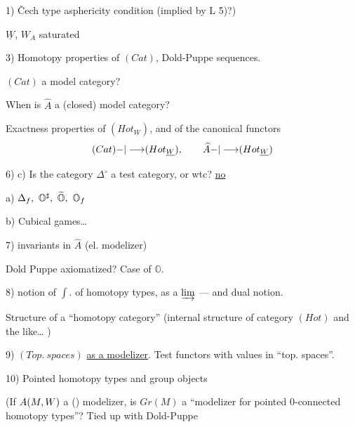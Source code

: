 1) \v{C}ech type asphericity condition (implied by L 5)?)

 $\underline W$, $W_A$ saturated

3) Homotopy properties of $(Cat)$,  Dold-Puppe sequences.

$(Cat)$ a model category?

 When is $\widehat A$ a (closed) model category?

 Exactness properties of $(Hot_{\underline W})$, and of the canonical functors
\[
(Cat){-|\longrightarrow}(Hot_{\underline W}),\qquad
\widehat A{-|\longrightarrow}(Hot_{\underline W})
\]

6) c) Is the category $\Delta^\circ$ a test category, or wtc? \uline{no}

a)  $\Delta_f,\ \mathbb O^{{\sharp}},\ \widetilde{\mathbb O},\ \mathbb O_f$

b) Cubical games\ldots

7)  invariants in $\widehat A$ (el. modelizer)

Dold Puppe axiomatized? Case of $\mathbb O$.

8)  notion of $\int.$ of homotopy types, as a $\varinjlim$ --- and dual notion.

Structure of a ``homotopy category'' (internal structure of category $(Hot)$ and the like\ldots
{})

9) $(Top.\ spaces)$ \uline{as a modelizer}. Test functors with values in ``top. spaces''.

10) Pointed homotopy types and group objects

(If ${A}(M,W)$ a () modelizer, is $Gr(M)$  a ``modelizer for pointed 0-connected homotopy types''? Tied up with Dold-Puppe 
